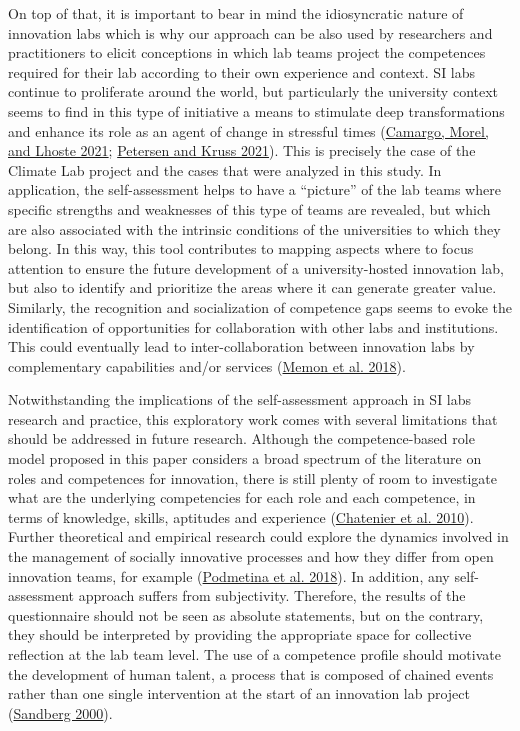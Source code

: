 \documentclass[AMA,STIX1COL,APA,STIX2COL]{WileyNJD-v2}
\begin{document}
On top of that, it is important to bear in mind the idiosyncratic nature
of innovation labs which is why our approach can be also used by
researchers and practitioners to elicit conceptions in which lab teams
project the competences required for their lab according to their own
experience and context. SI labs continue to proliferate around the
world, but particularly the university context seems to find in this
type of initiative a means to stimulate deep transformations and enhance
its role as an agent of change in stressful times
(\protect\hyperlink{ref-Camargo2021}{Camargo, Morel, and Lhoste 2021};
\protect\hyperlink{ref-Petersen2021}{Petersen and Kruss 2021}). This is
precisely the case of the Climate Lab project and the cases that were
analyzed in this study. In application, the self-assessment helps to
have a ``picture'' of the lab teams where specific strengths and
weaknesses of this type of teams are revealed, but which are also
associated with the intrinsic conditions of the universities to which
they belong. In this way, this tool contributes to mapping aspects where
to focus attention to ensure the future development of a
university-hosted innovation lab, but also to identify and prioritize
the areas where it can generate greater value. Similarly, the
recognition and socialization of competence gaps seems to evoke the
identification of opportunities for collaboration with other labs and
institutions. This could eventually lead to inter-collaboration between
innovation labs by complementary capabilities and/or services
(\protect\hyperlink{ref-Memon2018}{Memon et al. 2018}).

Notwithstanding the implications of the self-assessment approach in SI
labs research and practice, this exploratory work comes with several
limitations that should be addressed in future research. Although the
competence-based role model proposed in this paper considers a broad
spectrum of the literature on roles and competences for innovation,
there is still plenty of room to investigate what are the underlying
competencies for each role and each competence, in terms of knowledge,
skills, aptitudes and experience
(\protect\hyperlink{ref-Chatenier2010}{Chatenier et al. 2010}). Further
theoretical and empirical research could explore the dynamics involved
in the management of socially innovative processes and how they differ
from open innovation teams, for example
(\protect\hyperlink{ref-Podmetina2018}{Podmetina et al. 2018}). In
addition, any self-assessment approach suffers from subjectivity.
Therefore, the results of the questionnaire should not be seen as
absolute statements, but on the contrary, they should be interpreted by
providing the appropriate space for collective reflection at the lab
team level. The use of a competence profile should motivate the
development of human talent, a process that is composed of chained
events rather than one single intervention at the start of an innovation
lab project (\protect\hyperlink{ref-Sandberg2000}{Sandberg 2000}).
\end{document}
